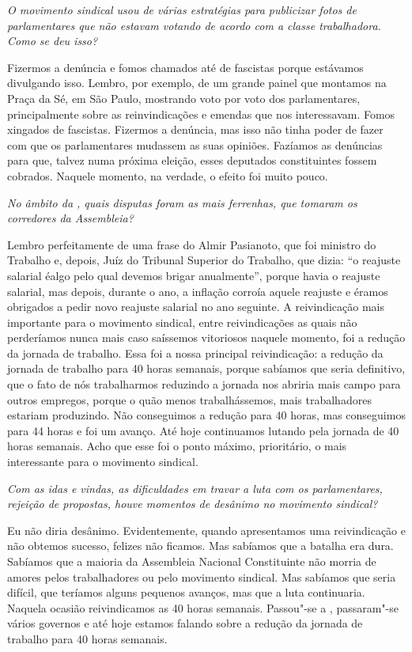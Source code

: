 \medskip

\noindent\emph{O movimento sindical usou de várias estratégias para publicizar
fotos de parlamentares que não estavam votando de acordo com a classe
trabalhadora. Como se deu isso?}

Fizermos a denúncia e fomos chamados até de
fascistas porque estávamos divulgando isso. Lembro, por exemplo, de um
grande painel que montamos na Praça da Sé, em São Paulo, mostrando voto
por voto dos parlamentares, principalmente sobre as reinvindicações e
emendas que nos interessavam. Fomos xingados de fascistas. Fizermos a
denúncia, mas isso não tinha poder de fazer com que os parlamentares
mudassem as suas opiniões. Fazíamos as denúncias para que, talvez numa
próxima eleição, esses deputados constituintes fossem cobrados. Naquele
momento, na verdade, o efeito foi muito pouco.

\medskip

\noindent\emph{No âmbito da , quais disputas foram as mais ferrenhas, que
tomaram os corredores da Assembleia?}

Lembro perfeitamente de uma frase do Almir
Pasianoto, que foi ministro do Trabalho e, depois, Juíz do Tribunal
Superior do Trabalho, que dizia: ``o reajuste salarial éalgo pelo qual
devemos brigar anualmente'', porque havia o reajuste salarial, mas
depois, durante o ano, a inflação corroía aquele reajuste e éramos
obrigados a pedir novo reajuste salarial no ano seguinte. A
reivindicação mais importante para o movimento sindical, entre
reivindicações as quais não perderíamos nunca mais caso saíssemos
vitoriosos naquele momento, foi a redução da jornada de trabalho. Essa
foi a nossa principal reivindicação: a redução da jornada de trabalho
para 40 horas semanais, porque sabíamos que seria definitivo, que o fato
de nós trabalharmos reduzindo a jornada nos abriria mais campo para
outros empregos, porque o quão menos trabalhássemos, mais trabalhadores
estariam produzindo. Não conseguimos a redução para 40 horas, mas
conseguimos para 44 horas e foi um avanço. Até hoje continuamos lutando
pela jornada de 40 horas semanais. Acho que esse foi o ponto máximo,
prioritário, o mais interessante para o movimento sindical.

\medskip

\noindent\emph{Com as idas e vindas, as dificuldades em travar a luta com os
parlamentares, rejeição de propostas, houve momentos de desânimo no
movimento sindical?}

Eu não diria desânimo. Evidentemente, quando
apresentamos uma reivindicação e não obtemos sucesso, felizes não
ficamos. Mas sabíamos que a batalha era dura. Sabíamos que a maioria da
Assembleia Nacional Constituinte não morria de amores pelos
trabalhadores ou pelo movimento sindical. Mas sabíamos que seria
difícil, que teríamos alguns pequenos avanços, mas que a luta
continuaria. Naquela ocasião reivindicamos as 40 horas semanais.
Passou"-se a , passaram"-se vários governos e até hoje estamos falando
sobre a redução da jornada de trabalho para 40 horas semanais.


